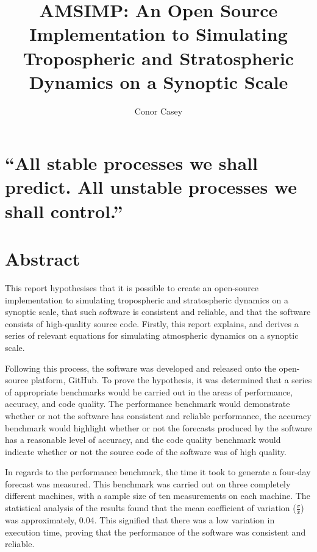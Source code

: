 \documentclass[hidelinks, 12pt]{style}
\title{AMSIMP: An Open Source Implementation to Simulating Tropospheric and Stratospheric Dynamics on a Synoptic Scale}
\author{Conor Casey}
\begin{document}
\maketitle

\clearpage\mbox{}\clearpage


\chapter*{
\centering
    ``All stable processes we shall predict. All unstable processes we shall control.”
\\[5pt]
}

\chapter*{Abstract}
This report hypothesises that it is possible to create an open-source implementation to simulating tropospheric and stratospheric dynamics on a synoptic scale, that such software is consistent and reliable, and that the software consists of high-quality source code. Firstly, this report explains, and derives a series of relevant equations for simulating atmospheric dynamics on a synoptic scale.

Following this process, the software was developed and released onto the open-source platform, GitHub. To prove the hypothesis, it was determined that a series of appropriate benchmarks would be carried out in the areas of performance, accuracy, and code quality. The performance benchmark would demonstrate whether or not the software has consistent and reliable performance, the accuracy benchmark would highlight whether or not the forecasts produced by the software has a reasonable level of accuracy, and the code quality benchmark would indicate whether or not the source code of the software was of high quality.

In regards to the performance benchmark, the time it took to generate a four-day forecast was measured. This benchmark was carried out on three completely different machines, with a sample size of ten measurements on each machine. The statistical analysis of the results found that the mean coefficient of variation ($\frac{\sigma}{\bar{x}}$) was approximately, 0.04. This signified that there was a low variation in execution time, proving that the performance of the software was consistent and reliable.
\end{document}
